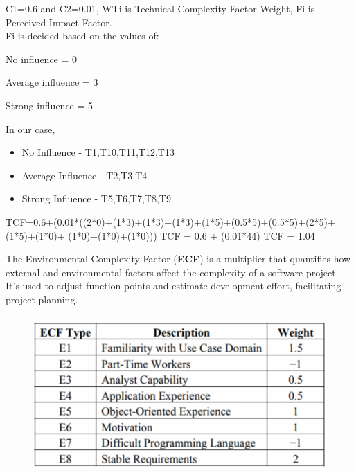 {{\normalsize{C1=0.6 and C2=0.01, WTi is Technical Complexity Factor Weight, Fi is Perceived Impact Factor. \linebreak \\
Fi is decided based on the values of:\\}
\begin{inparaitem}
    \item No influence = 0
    \item Average influence = 3
    \item Strong influence = 5 \linebreak \\
\end{inparaitem}

\normalsize{In our case,}
\begin{itemize}[noitemsep]
    \item No Influence - T1,T10,T11,T12,T13
    \item Average Influence - T2,T3,T4
    \item Strong Influence - T5,T6,T7,T8,T9
\end{itemize}

{\normalsize{TCF=0.6+(0.01*((2*0)+(1*3)+(1*3)+(1*3)+(1*5)+(0.5*5)+(0.5*5)+(2*5)+(1*5)+(1*0)+
(1*0)+(1*0)+(1*0)))\linebreak}
\normalsize{TCF = 0.6 + (0.01*44)\linebreak}
\normalsize{TCF = 1.04 \linebreak \\}

\normalsize{The Environmental Complexity Factor (\textbf{ECF}) is a multiplier that quantifies how external and environmental factors affect the complexity of a software project. It's used to adjust function points and estimate development effort, facilitating project planning.
}

\label{sec: Figure 8}
\begin{figure}[htp]
    \centering
    \includegraphics[width=14cm, height=6.01cm]{p8.png}
    \label{fig:Figure 8}
\end{figure}


}}}
